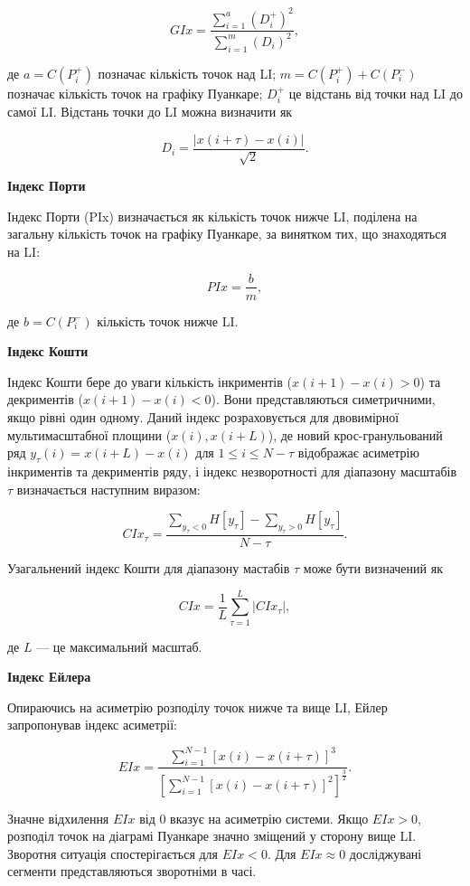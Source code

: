 \documentclass[
  letterpaper,
]{report}
\begin{document}
\[ 
GIx = \frac{\sum_{i=1}^{a} \left( D_{i}^{+} \right)^{2}}{\sum_{i=1}^{m} \left( D_{i} \right)^{2} }, 
\]

де \(a = C(P_{i}^{+})\) позначає кількість точок над LI;
\(m = C(P_{i}^{+}) + C(P_{i}^{-})\) позначає кількість точок на графіку
Пуанкаре; \(D_{i}^{+}\) це відстань від точки над LI до самої LI.
Відстань точки до LI можна визначити як

\[ 
D_{i} = \frac{|x(i+\tau) - x(i)|}{\sqrt{2}}. 
\]

\textbf{Індекс Порти}

Індекс Порти (PIx) визначається як кількість точок нижче LI, поділена на
загальну кількість точок на графіку Пуанкаре, за винятком тих, що
знаходяться на LI:

\[ 
PIx = \frac{b}{m}, 
\]

де \(b = C(P_{i}^{-})\) кількість точок нижче LI.

\textbf{Індекс Кошти}

Індекс Кошти бере до уваги кількість інкриментів (\(x(i+1)-x(i) > 0\))
та декриментів (\(x(i+1)-x(i) < 0\)). Вони представляються симетричними,
якщо рівні один одному. Даний індекс розраховується для двовимірної
мультимасштабної площини (\(x(i), x(i+L)\)), де новий крос-гранульований
ряд \(y_{\tau}(i) = x(i+L)-x(i)\) для \(1 \leq i \leq N-\tau\)
відображає асиметрію інкриментів та декриментів ряду, і індекс
незворотності для діапазону масштабів \(\tau\) визначається наступним
виразом:

\[ 
CIx_{\tau} = \frac{\sum_{y_{\tau}<0} H[y_{\tau}] - \sum_{y_{\tau}>0} H[y_{\tau}]}{N-\tau}. 
\]

Узагальнений індекс Кошти для діапазону мастабів \(\tau\) може бути
визначений як

\[ 
CIx = \frac{1}{L} \sum_{\tau=1}^{L} |CIx_{\tau}|, 
\]

де \(L\) --- це максимальний масштаб.

\textbf{Індекс Ейлера}

Опираючись на асиметрію розподілу точок нижче та вище LI, Ейлер
запропонував індекс асиметрії:

\[ 
EIx = \frac{\sum_{i=1}^{N-1} \left[ x(i)-x(i+\tau) \right]^{3}}{\left[ \sum_{i=1}^{N-1} \left[ x(i)-x(i+\tau) \right]^{2} \right]^{\frac{3}{2}}}. 
\]

Значне відхилення \(EIx\) від 0 вказує на асиметрію системи. Якщо
\(EIx>0\), розподіл точок на діаграмі Пуанкаре значно зміщений у сторону
вище LI. Зворотня ситуація спостерігається для \(EIx<0\). Для
\(EIx \approx 0\) досліджувані сегменти представляються зворотніми в
часі.
\end{document}
